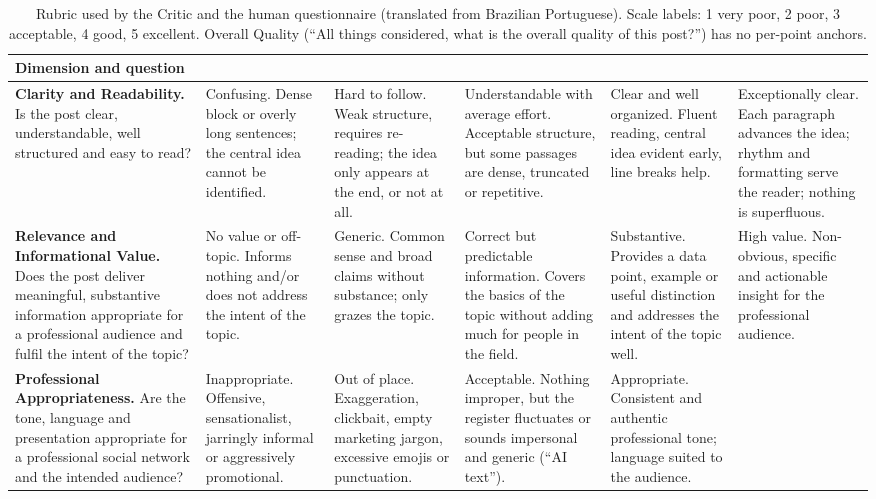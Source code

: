 \documentclass[a4paper,twoside]{article}
\begin{document}
\begin{table}[h]
\centering
\caption{Rubric used by the Critic and the human questionnaire (translated from Brazilian Portuguese). Scale labels: 1 very poor, 2 poor, 3 acceptable, 4 good, 5 excellent. Overall Quality (``All things considered, what is the overall quality of this post?'') has no per-point anchors.}
\label{tab:rubric}
\scriptsize
\setlength{\tabcolsep}{3pt}
\renewcommand{\arraystretch}{1.15}
\begin{tabularx}{\textwidth}{@{}>{\raggedright\arraybackslash}p{2.5cm}*{5}{>{\raggedright\arraybackslash}X}@{}}
\toprule
Dimension and question & 1 & 2 & 3 & 4 & 5 \\
\midrule
\textbf{Clarity and Readability.} Is the post clear, understandable, well structured and easy to read? &
Confusing. Dense block or overly long sentences; the central idea cannot be identified. &
Hard to follow. Weak structure, requires re-reading; the idea only appears at the end, or not at all. &
Understandable with average effort. Acceptable structure, but some passages are dense, truncated or repetitive. &
Clear and well organized. Fluent reading, central idea evident early, line breaks help. &
Exceptionally clear. Each paragraph advances the idea; rhythm and formatting serve the reader; nothing is superfluous. \\
\midrule
\textbf{Relevance and Informational Value.} Does the post deliver meaningful, substantive information appropriate for a professional audience and fulfil the intent of the topic? &
No value or off-topic. Informs nothing and/or does not address the intent of the topic. &
Generic. Common sense and broad claims without substance; only grazes the topic. &
Correct but predictable information. Covers the basics of the topic without adding much for people in the field. &
Substantive. Provides a data point, example or useful distinction and addresses the intent of the topic well. &
High value. Non-obvious, specific and actionable insight for the professional audience. \\
\midrule
\textbf{Professional Appropriateness.} Are the tone, language and presentation appropriate for a professional social network and the intended audience? &
Inappropriate. Offensive, sensationalist, jarringly informal or aggressively promotional. &
Out of place. Exaggeration, clickbait, empty marketing jargon, excessive emojis or punctuation. &
Acceptable. Nothing improper, but the register fluctuates or sounds impersonal and generic (``AI text''). &
Appropriate. Consistent and authentic professional tone; language suited to the audience. &

\end{tabularx}
\end{table}
\end{document}
